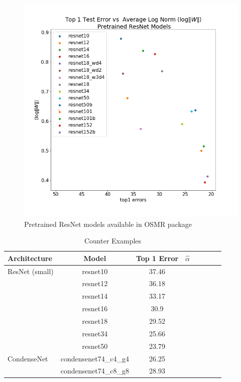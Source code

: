 \begin{figure}[!htb]
 \centering
   \includegraphics[scale=0.40]{img/ResNet_top1-lognorms.png}
   \caption{
Pretrained ResNet models available in OSMR package}
  \label{fig:resnet}
\end{figure}





\begin{table}[t]
\small
\begin{center}
\begin{tabular}{|p{1in}|c|c|c|c|c|c|c|}
\hline
Architecture 
 & Model
 & Top 1 Error & $\hat{\alpha}$ \\
\hline
ResNet (small)  & resnet10 & 37.46 & \\
& resnet12 & 36.18 & \\
& resnet14 & 33.17 & \\
& resnet16 & 30.9 & \\
& resnet18 & 29.52 & \\
& resnet34 & 25.66 & \\
& resnet50 & 23.79 & \\
\hline
CondenseNet & condensenet74\_c4\_g4 & 26.25 & \\
& condensenet74\_c8\_g8 & 28.93 & \\
\hline
\end{tabular}
\end{center}
\caption{Counter Examples}
\label{table:models}
\end{table}



